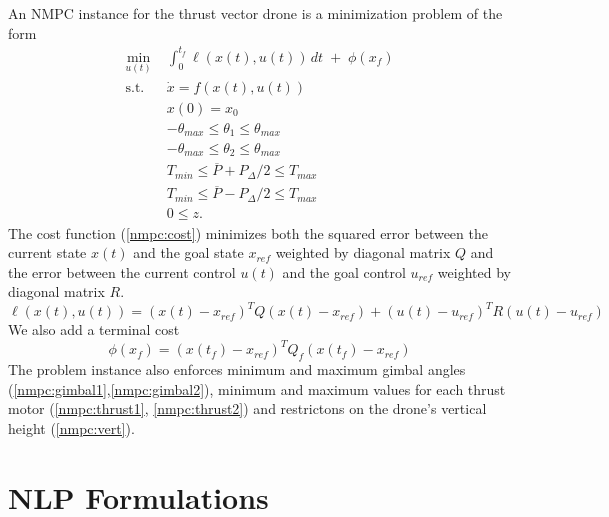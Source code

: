 \documentclass[]{article}
\newcommand{\nmpc}{NMPC}
\newcommand{\pdiff}{P_{\Delta}}
\newcommand{\pavg}{\overline{P}}
\begin{document}
 	An {\nmpc} instance for the thrust vector drone is a minimization problem of the form
	\begin{align}
	   \min_{u(t)} \; &  \int_{0}^{t_f} \ell(x(t),u(t))\,dt  \;+\; \phi(x_f) \label{nmpc:cost} \\
	   \text{s.t.} \;\; 	&  \dot{x} =  f(x(t),u(t))  \nonumber \\ 
	   				& x(0) = x_0 \nonumber \\
	   				&	-\theta_{max} \leq \theta_1 \leq \theta_{max} \label{nmpc:gimbal1} \\
	   				& 	-\theta_{max} \leq \theta_2 \leq \theta_{max} \label{nmpc:gimbal2} \\
	   				& 	T_{min}  \leq \pavg + \pdiff/2 \leq T_{max} \label{nmpc:thrust1} \\
	   				&    T_{min} \leq  \pavg - \pdiff/2 \leq T_{max} \label{nmpc:thrust2} \\
	   				&        0 \leq z. \label{nmpc:vert}
	\end{align}
	The cost function (\ref{nmpc:cost}) minimizes both the squared error between the current state $x(t)$ and the goal state $x_{ref}$ weighted by diagonal matrix $Q$ and the error between the current control $u(t)$ and the goal control $u_{ref}$ weighted by diagonal matrix $R$. 
	\begin{equation*}
		\ell(x(t),u(t))= (x(t)-x_{ref})^T Q (x(t)-x_{ref}) + (u(t)-u_{ref})^T R (u(t)-u_{ref}) 
	\end{equation*}
	We also add a terminal cost 
	\begin{equation*}
		\phi(x_f) = (x(t_f)-x_{ref})^T Q_f (x(t_f)-x_{ref})
	\end{equation*}
	The problem instance also enforces minimum and maximum gimbal angles (\ref{nmpc:gimbal1},\ref{nmpc:gimbal2}), minimum and maximum values for each thrust motor (\ref{nmpc:thrust1}, \ref{nmpc:thrust2}) and restrictons on the drone's vertical height (\ref{nmpc:vert}).




\section*{NLP Formulations}
\end{document}
